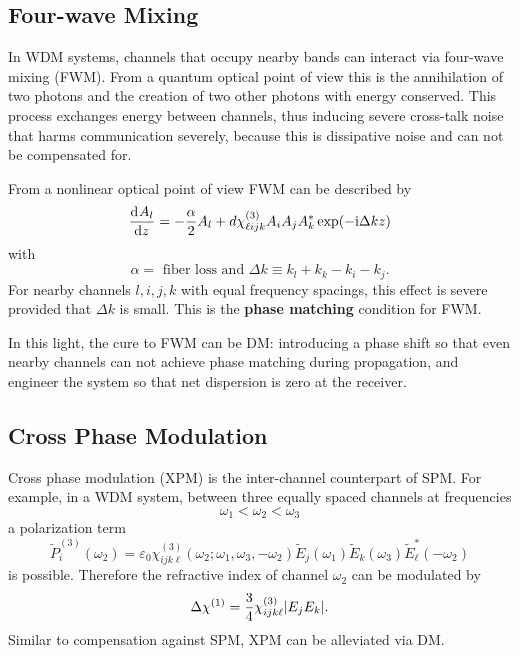 \documentclass[%
 reprint,
 amsmath,amssymb,
 aps,
]{revtex4-2}
\begin{document}
\subsection{Four-wave Mixing}
In WDM systems, channels that occupy 
nearby bands can interact via four-wave mixing (FWM). 
From a quantum optical point of view this is 
the annihilation of two photons 
and the creation of two other photons 
with energy conserved. 
This process exchanges energy between channels, 
thus inducing severe cross-talk noise 
that harms communication severely, 
because this is dissipative noise 
and can not be compensated for. 
\par
From a nonlinear optical point of view 
FWM can be described by 
\begin{equation}
    \label{eqn:CoupledWaveEquationForFWM}
    \dv[]{A_{l}}{z}
    =
    - \frac{\alpha}{2}
    A_{l}
    +
    d \chi^{(3)}_{\ell ijk}
    A_{i}A_{j}A^{*}_{k}
    \exp(-\mathrm{i} \Delta k z)
\end{equation}
with 
\[
    \alpha =\text{ fiber loss and }
    \Delta k
    \equiv 
    k_{l}+k_{k}-k_{i}-k_{j}.
\]
For nearby channels $l,i,j,k$ with equal 
frequency spacings, this effect is severe 
provided that $\Delta k$ is small. 
This is the \textbf{phase matching} condition 
for FWM. 
\par
In this light, the cure to FWM 
can be DM: introducing a phase shift so that 
even nearby channels can not achieve phase matching 
during propagation, and engineer the system so that 
net dispersion is zero at the receiver. 
\subsection{Cross Phase Modulation}
Cross phase modulation (XPM) is the inter-channel counterpart 
of SPM. For example, in a WDM system, 
between three equally spaced channels at frequencies 
\[
    \omega_1<\omega_2<\omega_3
\]
a polarization term 
\[
    \tilde{P}^{(3)}_{i}(\omega_2)
    =
    \varepsilon_0
    \chi^{(3)}_{ijk\ell}
    (\omega_2;\omega_1,\omega_3, -\omega_2)
    \tilde{E}_{j}(\omega_1)
    \tilde{E}_{k}(\omega_3)
    \tilde{E}^{*}_{\ell}(-\omega_2)
\]
is possible. Therefore the refractive index of channel $\omega_2$ 
can be modulated by 
\[
    \Delta \chi^{(1)}
    =
    \frac{3}{4}
    \chi^{(3)}_{ijk\ell}
    \abs{E_{j}E_{k}}. 
\]
Similar to compensation against SPM, XPM can be alleviated via DM. 
\end{document}
